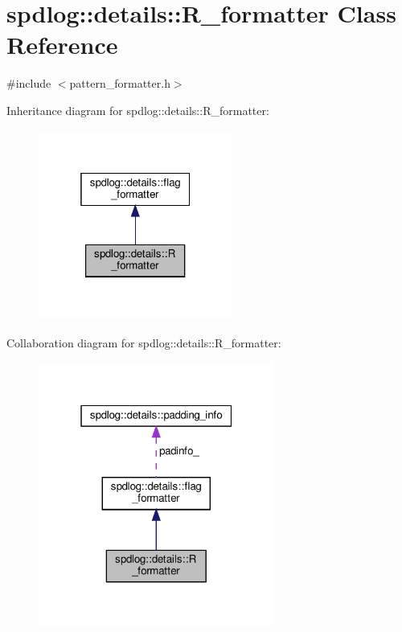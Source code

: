 \hypertarget{classspdlog_1_1details_1_1_r__formatter}{}\section{spdlog\+:\+:details\+:\+:R\+\_\+formatter Class Reference}
\label{classspdlog_1_1details_1_1_r__formatter}


{\ttfamily \#include $<$pattern\+\_\+formatter.\+h$>$}



Inheritance diagram for spdlog\+:\+:details\+:\+:R\+\_\+formatter\+:
\nopagebreak
\begin{figure}[H]
\begin{center}
\leavevmode
\includegraphics[width=181pt]{classspdlog_1_1details_1_1_r__formatter__inherit__graph}
\end{center}
\end{figure}


Collaboration diagram for spdlog\+:\+:details\+:\+:R\+\_\+formatter\+:
\nopagebreak
\begin{figure}[H]
\begin{center}
\leavevmode
\includegraphics[width=220pt]{classspdlog_1_1details_1_1_r__formatter__coll__graph}
\end{center}
\end{figure}
